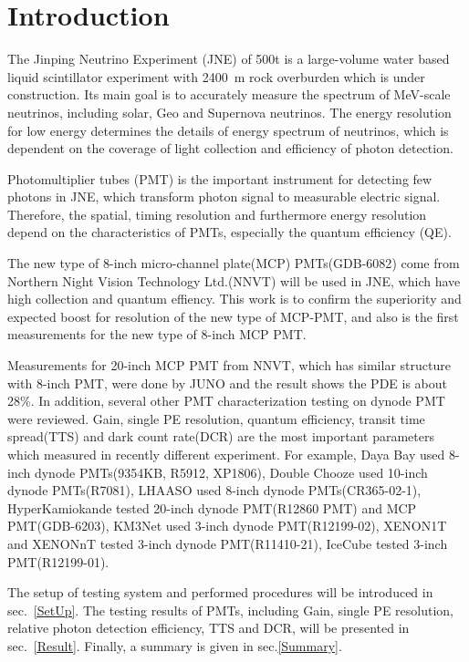 \section{Introduction}
The Jinping Neutrino Experiment (JNE) of 500t is a large-volume water based liquid scintillator experiment with \SI{2400}{m} rock overburden\cite{LetterJNE2017} which is under construction. Its main goal is to accurately measure the spectrum of MeV-scale neutrinos, including solar, Geo and Supernova neutrinos\cite{LetterJNE2017}.  The energy resolution for low energy determines the details of energy spectrum of neutrinos, which is dependent on the coverage of light collection and efficiency of photon detection.

Photomultiplier tubes (PMT) is the important instrument for detecting few photons in JNE, which transform photon signal to measurable electric signal. Therefore, the spatial, timing resolution and furthermore energy resolution depend on the characteristics of PMTs, especially the quantum efficiency (QE). 

The new type of 8-inch micro-channel plate(MCP) PMTs(GDB-6082\cite{GDB-6082}) come from Northern Night Vision Technology Ltd.(NNVT) will be used in JNE, which have high collection and quantum effiency. This work is to confirm the superiority and expected boost for resolution of the new type of MCP-PMT, and also is the first measurements for the new type of 8-inch MCP PMT.

Measurements for 20-inch MCP PMT from NNVT, which has similar structure with 8-inch PMT, were done by JUNO and the result shows the PDE is about 28\%\cite{JUNOMassTesting}. In addition, several other PMT characterization testing on dynode PMT were reviewed. Gain, single PE resolution, quantum efficiency, transit time spread(TTS) and dark count rate(DCR) are the most important parameters which measured in recently different experiment. For example, Daya Bay used 8-inch dynode PMTs(9354KB, R5912, XP1806)\cite{DayaBayTesting}, Double Chooze used 10-inch dynode PMTs(R7081)\cite{DoubleChoozeTesting}, LHAASO used 8-inch dynode PMTs(CR365-02-1)\cite{LHAASOTesting}, HyperKamiokande tested 20-inch dynode PMT(R12860 PMT) and MCP PMT(GDB-6203)\cite{HyperKTesting}, KM3Net used 3-inch dynode PMT(R12199-02)\cite{KM3NetTesting}, XENON1T and XENONnT tested 3-inch dynode PMT(R11410-21)\cite{XENON1TTesting}\cite{XENONnTTesting}, IceCube tested 3-inch PMT(R12199-01)\cite{IceCubeTesting}.

The setup of testing system and performed procedures will be introduced in sec.~\ref{SetUp}. The testing results of PMTs, including Gain, single PE resolution, relative photon detection efficiency, TTS and DCR, will be presented in sec.~\ref{Result}. Finally, a summary is given in sec.\ref{Summary}.